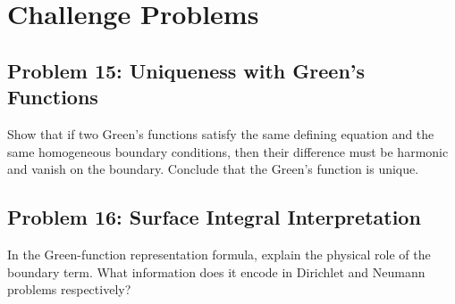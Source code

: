 \documentclass[hidelinks]{article}
\begin{document}
\section{Challenge Problems}
\subsection{Problem 15: Uniqueness with Green's Functions}
Show that if two Green's functions satisfy the same defining equation and the same homogeneous boundary conditions, then their difference must be harmonic and vanish on the boundary. Conclude that the Green's function is unique.

\subsection{Problem 16: Surface Integral Interpretation}
In the Green-function representation formula, explain the physical role of the boundary term. What information does it encode in Dirichlet and Neumann problems respectively?
\end{document}
